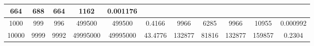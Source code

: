 \documentclass[a4paper,12pt]{article}
\begin{document}
\begin{table}[h]
\begin{tabular}{|c|ccccc|ccccc|}
            \multicolumn{1}{c|}{664} &
            \multicolumn{1}{c|}{688} &
            \multicolumn{1}{c|}{664} &
            \multicolumn{1}{c|}{1162} &
            0.001176 \\ \hline
            1000 &
            \multicolumn{1}{c|}{999} &
            \multicolumn{1}{c|}{996} &
            \multicolumn{1}{c|}{499500} &
            \multicolumn{1}{c|}{499500} &
            0.4166 &
            \multicolumn{1}{c|}{9966} &
            \multicolumn{1}{c|}{6285} &
            \multicolumn{1}{c|}{9966} &
            \multicolumn{1}{c|}{10955} &
            0.000992 \\ \hline
            10000 &
            \multicolumn{1}{c|}{9999} &
            \multicolumn{1}{c|}{9992} &
            \multicolumn{1}{c|}{49995000} &
            \multicolumn{1}{c|}{49995000} &
            43.4776 &
            \multicolumn{1}{c|}{132877} &
            \multicolumn{1}{c|}{81816} &
            \multicolumn{1}{c|}{132877} &
            \multicolumn{1}{c|}{159857} &
            0.2304 \\ \hline
        \end{tabular}
    \end{table}
\end{document}
